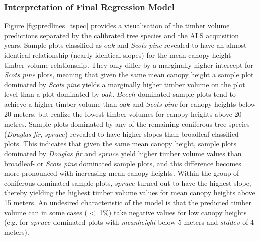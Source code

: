 

\subsubsection*{Interpretation of Final Regression Model}
\label{sec:prop_regmod_final}
Figure \ref{fig:predlines_tspec} provides a visualisation of the timber volume predictions separated by the calibrated tree species and the ALS acquisition years. Sample plots classified as $oak$ and \textit{Scots pine} revealed to have an almost identical relationship (nearly identical slopes) for the mean canopy height - timber volume relationship. They only differ by a marginally higher intercept for \textit{Scots pine} plots, meaning that given the same mean canopy height a sample plot dominated by \textit{Scots pine} yields a marginally higher timber volume on the plot level than a plot dominated by $oak$. $Beech$-dominated sample plots tend to achieve a higher timber volume than $oak$ and \textit{Scots pine} for canopy heights below 20 meters, but realize the lowest timber volumes for canopy heights above 20 metres. Sample plots dominated by any of the remaining coniferous tree species (\textit{Douglas fir}, $spruce$) revealed to have higher slopes than broadleaf classified plots. This indicates that given the same mean canopy height, sample plots dominated by \textit{Douglas fir} and $spruce$ yield higher timber volume values than broadleaf- or \textit{Scots pine} dominated sample plots, and this difference becomes more pronounced with increasing mean canopy heights. Within the group of coniferous-dominated sample plots, $spruce$ turned out to have the highest slope, thereby yielding the highest timber volume values for mean canopy heights above 15 meters. An undesired characteristic of the model is that the predicted timber volume can in some cases ($<$ 1\%) take negative values for low canopy heights (e.g. for $spruce$-dominated plots with \textit{meanheight} below 5 meters and $stddev$ of 4 meters). 


